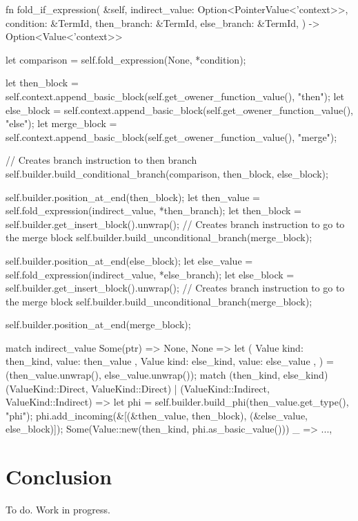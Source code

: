 \documentclass[
  oneside,
  english,
  coorientadorbanca,
  noabntexcite
]{ufsc-thesis-rn46-2019}
\begin{document}
\begin{rustcode}
fn fold_if_expression(
  &self,
  indirect_value: Option<PointerValue<'context>>,
  condition: &TermId,
  then_branch: &TermId,
  else_branch: &TermId,
) -> Option<Value<'context>> {
  let comparison = self.fold_expression(None, *condition);

  let then_block = self.context.append_basic_block(self.get_owener_function_value(), "then");
  let else_block = self.context.append_basic_block(self.get_owener_function_value(), "else");
  let merge_block = self.context.append_basic_block(self.get_owener_function_value(), "merge");

  // Creates branch instruction to then branch
  self.builder.build_conditional_branch(comparison, then_block, else_block);

  self.builder.position_at_end(then_block);
  let then_value = self.fold_expression(indirect_value, *then_branch);
  let then_block = self.builder.get_insert_block().unwrap();
  // Creates branch instruction to go to the merge block
  self.builder.build_unconditional_branch(merge_block);

  self.builder.position_at_end(else_block);
  let else_value = self.fold_expression(indirect_value, *else_branch);
  let else_block = self.builder.get_insert_block().unwrap();
  // Creates branch instruction to go to the merge block
  self.builder.build_unconditional_branch(merge_block);

  self.builder.position_at_end(merge_block); 

  match indirect_value {
    Some(ptr) => None,
    None => {
      let (
        Value { kind: then_kind, value: then_value },
        Value { kind: else_kind, value: else_value },
      ) = (then_value.unwrap(), else_value.unwrap());
      match (then_kind, else_kind) {
        (ValueKind::Direct, ValueKind::Direct) | (ValueKind::Indirect, ValueKind::Indirect) => {
          let phi = self.builder.build_phi(then_value.get_type(), "phi");
          phi.add_incoming(&[(&then_value, then_block), (&else_value, else_block)]);
          Some(Value::new(then_kind, phi.as_basic_value()))
        }
        _ => ...,
      }
    }
  }
}
\end{rustcode}

\section{Conclusion}

To do. Work in progress.


\postextual{}

\printbibliography{}
\end{document}
